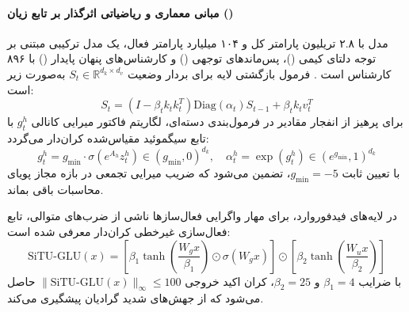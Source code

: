 \item {}

\paragraph*{مبانی معماری و ریاضیاتی اثرگذار بر تابع زیان ()}
مدل  با ۲.۸ تریلیون پارامتر کل و ۱۰۴ میلیارد پارامتر فعال، یک مدل ترکیبی مبتنی بر توجه دلتای کیمی ()، پس‌ماندهای توجهی () و کارشناس‌های پنهان پایدار () با ۸۹۶ کارشناس است \cite{kimi2026k3}. فرمول بازگشتی لایه  برای بردار وضعیت $S_t \in \mathbb{R}^{d_k \times d_v}$ به‌صورت زیر است:
\begin{equation}
    S_t = \left( I - \beta_t k_t k_t^T \right) \text{Diag}(\alpha_t) S_{t-1} + \beta_t k_t v_t^T
\end{equation}
برای پرهیز از انفجار مقادیر در فرمول‌بندی دسته‌ای، لگاریتم فاکتور میرایی کانالی $g_t^h$ با تابع سیگموئید مقیاس‌شده کران‌دار می‌گردد:
\begin{equation}
    g_t^h = g_{\min} \cdot \sigma\left(e^{A_h} z_t^h\right) \in (g_{\min}, 0)^{d_k}, \quad \alpha_t^h = \exp(g_t^h) \in (e^{g_{\min}}, 1)^{d_k}
\end{equation}
با تعیین ثابت $g_{\min} = -5$، تضمین می‌شود که ضریب میرایی تجمعی در بازه مجاز پویای محاسبات  باقی بماند.

در لایه‌های فیدفوروارد، برای مهار واگرایی فعال‌سازها ناشی از ضرب‌های متوالی، تابع فعال‌سازی غیرخطی کران‌دار  معرفی شده است:
\begin{equation}
    \text{SiTU-GLU}(x) = \left[ \beta_1 \tanh\left(\frac{W_g x}{\beta_1}\right) \odot \sigma(W_g x) \right] \odot \left[ \beta_2 \tanh\left(\frac{W_u x}{\beta_2}\right) \right]
\end{equation}
با ضرایب $\beta_1 = 4$ و $\beta_2 = 25$، کران اکید خروجی $\|\text{SiTU-GLU}(x)\|_\infty \le 100$ حاصل می‌شود که از جهش‌های شدید گرادیان پیشگیری می‌کند.

